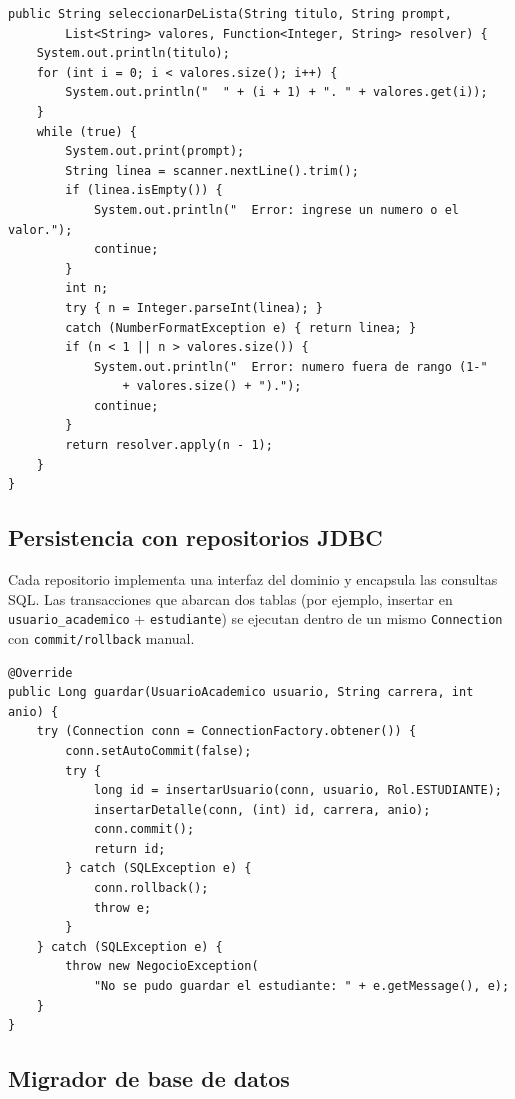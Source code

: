 \documentclass[12pt,a4paper]{article}
\begin{document}
\begin{lstlisting}[caption={InputReader.java --- seleccion por lista numerada.}]
public String seleccionarDeLista(String titulo, String prompt,
        List<String> valores, Function<Integer, String> resolver) {
    System.out.println(titulo);
    for (int i = 0; i < valores.size(); i++) {
        System.out.println("  " + (i + 1) + ". " + valores.get(i));
    }
    while (true) {
        System.out.print(prompt);
        String linea = scanner.nextLine().trim();
        if (linea.isEmpty()) {
            System.out.println("  Error: ingrese un numero o el valor.");
            continue;
        }
        int n;
        try { n = Integer.parseInt(linea); }
        catch (NumberFormatException e) { return linea; }
        if (n < 1 || n > valores.size()) {
            System.out.println("  Error: numero fuera de rango (1-"
                + valores.size() + ").");
            continue;
        }
        return resolver.apply(n - 1);
    }
}
\end{lstlisting}

\subsection{Persistencia con repositorios JDBC}

Cada repositorio implementa una interfaz del dominio y encapsula las
consultas SQL. Las transacciones que abarcan dos tablas (por ejemplo,
insertar en \texttt{usuario\_academico} + \texttt{estudiante}) se ejecutan
dentro de un mismo \texttt{Connection} con \texttt{commit/rollback}
manual.

\begin{lstlisting}[caption={EstudianteRepositoryJdbc --- guardar
con transaccion manual.}]
@Override
public Long guardar(UsuarioAcademico usuario, String carrera, int anio) {
    try (Connection conn = ConnectionFactory.obtener()) {
        conn.setAutoCommit(false);
        try {
            long id = insertarUsuario(conn, usuario, Rol.ESTUDIANTE);
            insertarDetalle(conn, (int) id, carrera, anio);
            conn.commit();
            return id;
        } catch (SQLException e) {
            conn.rollback();
            throw e;
        }
    } catch (SQLException e) {
        throw new NegocioException(
            "No se pudo guardar el estudiante: " + e.getMessage(), e);
    }
}
\end{lstlisting}

\subsection{Migrador de base de datos}
\end{document}
